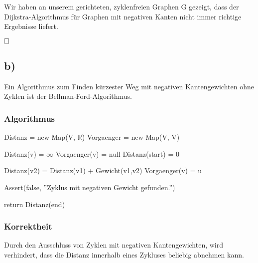 \documentclass[12pt]{scrartcl}%
\theoremstyle{nonumberplain}
\newcommand{\R}{\mathbb{R}}
\begin{document}
Wir haben an unserem gerichteten, zyklenfreien Graphen G gezeigt, dass der Dijkstra-Algorithmus für Graphen mit negativen Kanten nicht immer richtige Ergebnisse liefert.

$\hfill \square $

\subsection*{b)}
Ein Algorithmus zum Finden kürzester Weg mit negativen Kantengewichten ohne Zyklen ist der Bellman-Ford-Algorithmus.

\subsubsection*{Algorithmus}
\begin{algorithm}[H]
	\LinesNumbered
	
	
	\BlankLine
	\BlankLine
	
	Distanz = new Map(V, $\R$)\;
	Vorgaenger = new Map(V, V)\;
	
	 {
		Distanz(v) = $\infty$\;
		Vorgaenger(v) = null\;		
	}
	Distanz(start) = 0\;
	
	\BlankLine
	\BlankLine
	
	 {
		 {
			 {
				Distanz(v2) = Distanz(v1) + Gewicht(v1,v2)\;
				Vorgaenger(v) = u\;
			}
		}
	}
	
	\BlankLine
	\BlankLine
	
	 {
		 {
			Assert(false, ''Zyklus mit negativen Gewicht gefunden.'')\;
		}
	}
	
	\BlankLine
	
	return Distanz(end)\;
\end{algorithm}

\newpage

\subsubsection*{Korrektheit}
Durch den Ausschluss von Zyklen mit negativen Kantengewichten, wird verhindert, dass die Distanz innerhalb eines Zykluses beliebig abnehmen kann.
\end{document}
